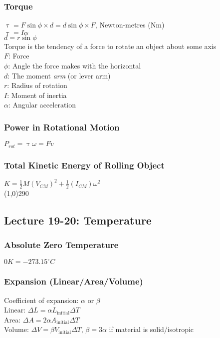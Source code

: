 \documentclass[10 pt]{article}
\begin{document}
\begin{multicols}{2}
\subsubsection*{Torque}
$\uptau = F \sin{\phi} \times d = d \sin{\phi} \times F$, Newton-metres (Nm) \\
\indent $\uptau = I\alpha$ \\
\indent $d = r \sin{\phi}$\\
Torque is the tendency of a force to rotate an object about some axis\\
$F$: Force \\
$\phi$: Angle the force makes with the horizontal \\
$d$: The moment {\it arm} (or lever arm) \\
$r$: Radius of rotation \\
$I$: Moment of inertia \\
$\alpha$: Angular acceleration
\subsubsection*{Power in Rotational Motion}
$P_{rot} = \uptau \omega = Fv$
\subsubsection*{Total Kinetic Energy of Rolling Object}
$\displaystyle K = \frac{1}{2}M(V_{CM})^2 + \frac{1}{2}(I_{CM})\omega^2$ \\
\line(1,0){290}
\subsection*{Lecture 19-20: Temperature}
\subsubsection*{Absolute Zero Temperature}
$0K = -273.15^\circ C$
\subsubsection*{Expansion (Linear/Area/Volume)}
Coefficient of expansion: $\alpha \textrm{ or } \beta$\\
\noindent Linear: $\Delta L = \alpha L_{\textrm{initial}} \Delta T$ \\
\noindent Area: $\Delta A = 2 \alpha A_{\textrm{initial}} \Delta T$ \\
\noindent Volume: $\Delta V = \beta V_{\textrm{initial}} \Delta T$, $\beta=3\alpha$ if material is solid/isotropic

\end{multicols}
\end{document}
